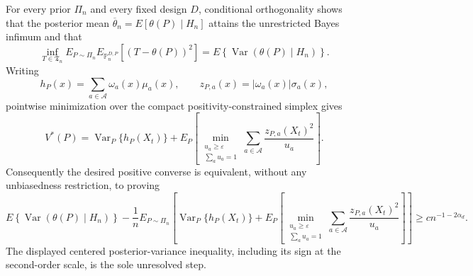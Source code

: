 For every prior \(\Pi_n\) and every fixed design \(D\), conditional orthogonality shows that the posterior mean \(\overline\theta_n=E[\theta(P)\mid H_n]\) attains the unrestricted Bayes infimum and that
\[
\inf_{T\in\mathfrak T_n}
E_{P\sim\Pi_n}E_{\mathbb P_n^{D,P}}[(T-\theta(P))^2]
=E\!\left\{\operatorname{Var}(\theta(P)\mid H_n)\right\}.
\]
Writing
\[
h_P(x)=\sum_{a\in\mathcal A}\omega_a(x)\mu_a(x),
\qquad
z_{P,a}(x)=|\omega_a(x)|\sigma_a(x),
\]
pointwise minimization over the compact positivity-constrained simplex gives
\[
V^*(P)=\operatorname{Var}_P\{h_P(X_t)\}
+E_P\!\left[
\min_{\substack{u_a\geq\varepsilon\\\sum_a u_a=1}}
\sum_{a\in\mathcal A}\frac{z_{P,a}(X_t)^2}{u_a}
\right].
\]
Consequently the desired positive converse is equivalent, without any unbiasedness restriction, to proving
\[
E\!\left\{\operatorname{Var}(\theta(P)\mid H_n)\right\}
-\frac1n E_{P\sim\Pi_n}\!\left[
\operatorname{Var}_P\{h_P(X_t)\}
+E_P\!\left[
\min_{\substack{u_a\geq\varepsilon\\\sum_a u_a=1}}
\sum_{a\in\mathcal A}\frac{z_{P,a}(X_t)^2}{u_a}
\right]
\right]
\geq c n^{-1-2\alpha_d}.
\]
The displayed centered posterior-variance inequality, including its sign at the second-order scale, is the sole unresolved step.